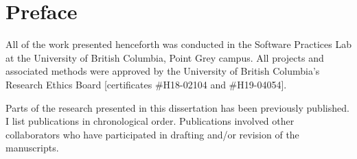 
\chapter{Preface}

All of the work presented henceforth was conducted in the Software Practices
Lab at the University of British Columbia, Point Grey campus.
All projects and associated methods were approved by the University of British Columbia's Research
Ethics Board [certificates \#H18-02104 and \#H19-04054].



Parts of the research presented in this dissertation has been previously published.
I list publications in chronological order. Publications
involved other collaborators who have participated in drafting and/or revision of the manuscripts. 


